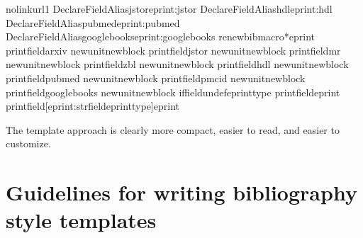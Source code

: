 \documentclass[letterpaper,10pt,english]{sphinxmanual}
\begin{document}
\begin{sphinxVerbatim}[commandchars=\\\{\}]
    \PYGZob{}\PYGZbs{}nolinkurl\PYGZob{}\PYGZsh{}1\PYGZcb{}\PYGZcb{}\PYGZcb{}
\PYGZbs{}DeclareFieldAlias\PYGZob{}jstor\PYGZcb{}\PYGZob{}eprint:jstor\PYGZcb{}
\PYGZbs{}DeclareFieldAlias\PYGZob{}hdl\PYGZcb{}\PYGZob{}eprint:hdl\PYGZcb{}
\PYGZbs{}DeclareFieldAlias\PYGZob{}pubmed\PYGZcb{}\PYGZob{}eprint:pubmed\PYGZcb{}
\PYGZbs{}DeclareFieldAlias\PYGZob{}googlebooks\PYGZcb{}\PYGZob{}eprint:googlebooks\PYGZcb{}
\PYGZbs{}renewbibmacro*\PYGZob{}eprint\PYGZcb{}\PYGZob{}\PYGZpc{}
\PYGZbs{}printfield\PYGZob{}arxiv\PYGZcb{}\PYGZpc{}
\PYGZbs{}newunit\PYGZbs{}newblock
\PYGZbs{}printfield\PYGZob{}jstor\PYGZcb{}\PYGZpc{}
\PYGZbs{}newunit\PYGZbs{}newblock
\PYGZbs{}printfield\PYGZob{}mr\PYGZcb{}\PYGZpc{}
\PYGZbs{}newunit\PYGZbs{}newblock
\PYGZbs{}printfield\PYGZob{}zbl\PYGZcb{}\PYGZpc{}
\PYGZbs{}newunit\PYGZbs{}newblock
\PYGZbs{}printfield\PYGZob{}hdl\PYGZcb{}\PYGZpc{}
\PYGZbs{}newunit\PYGZbs{}newblock
\PYGZbs{}printfield\PYGZob{}pubmed\PYGZcb{}\PYGZpc{}
\PYGZbs{}newunit\PYGZbs{}newblock
\PYGZbs{}printfield\PYGZob{}pmcid\PYGZcb{}\PYGZpc{}
\PYGZbs{}newunit\PYGZbs{}newblock
\PYGZbs{}printfield\PYGZob{}googlebooks\PYGZcb{}\PYGZpc{}
\PYGZbs{}newunit\PYGZbs{}newblock
\PYGZbs{}iffieldundef\PYGZob{}eprinttype\PYGZcb{}
    \PYGZob{}\PYGZbs{}printfield\PYGZob{}eprint\PYGZcb{}\PYGZcb{}
    \PYGZob{}\PYGZbs{}printfield[eprint:\PYGZbs{}strfield\PYGZob{}eprinttype\PYGZcb{}]\PYGZob{}eprint\PYGZcb{}\PYGZcb{}\PYGZcb{}
\end{sphinxVerbatim}

The template approach is clearly more compact, easier to read, and easier to customize.


\chapter{Guidelines for writing bibliography style templates}
\label{\detokenize{guidelines_for_writing_style_templates:guidelines-for-writing-bibliography-style-templates}}\label{\detokenize{guidelines_for_writing_style_templates::doc}}
\end{document}
